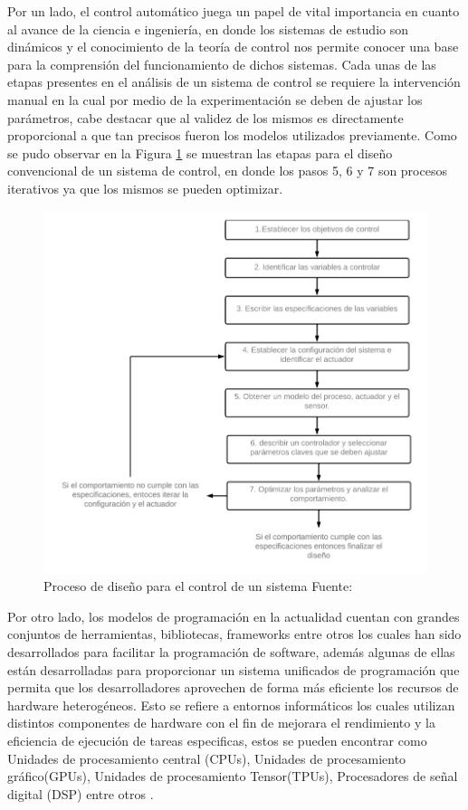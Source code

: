 \documentclass[12pt]{article}
\begin{document}

Por un lado, el control automático juega un papel de vital importancia en cuanto al avance de la ciencia e ingeniería, en donde los sistemas de estudio son dinámicos y el conocimiento de la teoría de control nos permite conocer una base para la comprensión del funcionamiento de dichos sistemas. Cada unas de las etapas presentes en el análisis de un sistema de control se requiere la intervención manual en la cual por medio de la experimentación se deben de ajustar los parámetros, cabe destacar que al validez de los mismos es directamente proporcional a que tan precisos fueron los modelos utilizados previamente. Como se pudo observar en la Figura \ref{fig:diagrama} se muestran las etapas para el diseño convencional de un sistema de control, en donde los pasos 5, 6 y 7 son procesos iterativos ya que los mismos se pueden optimizar. 


\begin{figure}
  \centering
  \includegraphics[scale=0.5]{diagramas/image.png}
  \caption{Proceso de diseño para el control de un sistema Fuente: \cite{4}}
  \label{fig:diagrama}
\end{figure}



Por otro lado, los modelos de programación en la actualidad cuentan con grandes conjuntos de herramientas, bibliotecas, frameworks entre otros los cuales han sido desarrollados para facilitar la programación de software, además algunas de ellas están desarrolladas para proporcionar un sistema unificados de programación que permita que los desarrolladores aprovechen de forma más eficiente los recursos de hardware heterogéneos. Esto se refiere a entornos informáticos los cuales utilizan distintos componentes de hardware con el fin de mejorara el rendimiento y la eficiencia de ejecución de tareas especificas, estos se pueden encontrar como Unidades de procesamiento central (CPUs), Unidades de procesamiento gráfico(GPUs), Unidades de procesamiento Tensor(TPUs), Procesadores de señal digital (DSP) entre otros \cite{costanzo2022migrating}.
\end{document}
